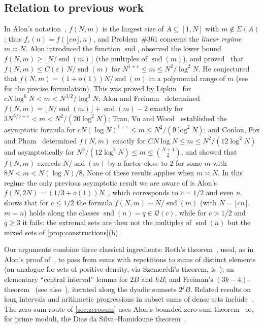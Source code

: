\documentclass[11pt,reqno]{amsart}
\numberwithin{equation}{section}
\theoremstyle{definition}
\theoremstyle{remark}
\newcommand{\eps}{\varepsilon}
\newcommand{\floor}[1]{\lfloor #1\rfloor}
\newcommand{\snd}{\operatorname{snd}}
\newcommand{\Sig}{\Sigma}
\begin{document}
\subsection{Relation to previous work}\label{subsec:literature}
In Alon's notation~\cite{Al87}, $f(N,m)$ is the largest size of $A\subseteq[1,N]$ with $m\notin\Sig(A)$; thus $f_c(n)=f(\floor{cn},n)$, and Problem~\#361 concerns the \emph{linear regime} $m\asymp N$. Alon introduced the function $\snd$, observed the lower bound $f(N,m)\ge\floor{N/\snd(m)}$ (the multiples of $\snd(m)$), and proved~\cite[Theorem~1.2]{Al87} that $f(N,m)\le C(\eps)\,N/\snd(m)$ for $N^{1+\eps}\le m\le N^2/\log^2N$. He conjectured~\cite[Conjecture~4.3]{Al87} that $f(N,m)=(1+o(1))N/\snd(m)$ in a polynomial range of $m$ (see~\cite{TVW09} for the precise formulation). This was proved by Lipkin~\cite{Li89} for $cN\log^6N<m<N^{3/2}/\log^3N$; Alon and Freiman~\cite{AF88} determined $f(N,m)=\floor{N/\snd(m)}+\snd(m)-2$ exactly for $3N^{5/3+\eps}<m<N^2/(20\log^2N)$; Tran, Vu and Wood~\cite{TVW09} established the asymptotic formula for $cN(\log N)^{1+\eps}\le m\le N^2/(9\log^2N)$; and Conlon, Fox and Pham~\cite{CFP} determined $f(N,m)$ exactly for $CN\log N\le m\le N^2/(12\log^2N)$ and asymptotically for $N^2/(12\log^2N)\le m\le\binom{N+1}2$, and showed that $f(N,m)$ exceeds $N/\snd(m)$ by a factor close to $2$ for some $m$ with $8N<m<N(\log N)/8$. None of these results applies when $m\asymp N$. In this regime the only previous asymptotic result we are aware of is Alon's $f(N,2N)=(1/3+o(1))N$~\cite[Corollary~2.6]{Al87}, which corresponds to $c=1/2$ and even $n$.  shows that for $c\le1/2$ the formula $f(N,m)\sim N/\snd(m)$ (with $N=\floor{cn}$, $m=n$) holds along the classes $\snd(n)=q\in\mathcal Q(c)$, while for $c>1/2$ and $q\ge3$ it fails: the extremal sets are then not the multiples of $\snd(n)$ but the mixed sets of \cref{prop:constructions}(b).

Our arguments combine three classical ingredients: Roth's theorem~\cite{Ro53}, used, as in Alon's proof of~\cite[Proposition~2.5]{Al87}, to pass from sums with repetitions to sums of distinct elements (an analogue for sets of positive density, via Szemer\'edi's theorem, is~\cite[Lemmas~1 and~2]{ENS88}); an elementary ``central interval'' lemma for $2B$ and $hB$; and Freiman's $(3k-4)$-theorem~\cite{Fr73} (see also~\cite{LS95,HP02,Na96}), iterated along the dyadic sumsets $2^jB$. Related results on long intervals and arithmetic progressions in subset sums of dense sets include~\cite{EF90,NS89,Le97,Le03,SV06}. The zero-sum route of \cref{sec:zerosum} uses Alon's bounded zero-sum theorem~\cite[Theorem~1.1]{Al87} or, for prime moduli, the Dias da Silva--Hamidoune theorem~\cite{DSH94,ANR96}.
\end{document}
